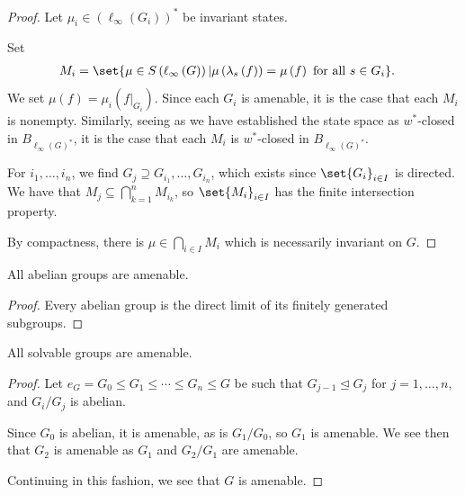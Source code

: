 \begin{proof}
  Let $\mu_i\in \left(\ell_{\infty}\left(G_i\right)\right)^{\ast}$ be invariant states.\newline

  Set
  \begin{align*}
    M_i &= \set{\mu\in S\left(\ell_{\infty}\left(G\right)\right)| \mu\left(\lambda_s\left(f\right)\right) = \mu\left(f\right)\text{ for all }s\in G_i}.
  \end{align*}
  We set $\mu\left(f\right) = \mu_i\left(f|_{G_i}\right)$. Since each $G_i$ is amenable, it is the case that each $M_i$ is nonempty. Similarly, seeing as we have established the state space as $w^{\ast}$-closed in $B_{\ell_{\infty}\left(G\right)^{\ast}}$, it is the case that each $M_i$ is $w^{\ast}$-closed in $B_{\ell_{\infty}\left(G\right)^{\ast}}$.\newline

  For $i_1,\dots,i_n$, we find $G_j \supseteq G_{i_1},\dots,G_{i_n}$, which exists since $\set{G_i}_{i\in I}$ is directed. We have that $M_j\subseteq \bigcap_{k=1}^{n}M_{i_k}$, so $\set{M_i}_{i\in I}$ has the finite intersection property.\newline

  By compactness, there is $\mu\in \bigcap_{i\in I}M_i$ which is necessarily invariant on $G$.
\end{proof}
\begin{corollary}
  All abelian groups are amenable.
\end{corollary}
\begin{proof}
  Every abelian group is the direct limit of its finitely generated subgroups.
\end{proof}
\begin{corollary}\label{cor:solvable_groups_amenable}
  All solvable groups are amenable.
\end{corollary}
\begin{proof}
  Let $e_G = G_0 \leq G_1\leq\cdots\leq G_n\leq G$ be such that $G_{j-1}\trianglelefteq G_j$ for $j=1,\dots,n$, and $G_i/G_j$ is abelian.\newline

  Since $G_0$ is abelian, it is amenable, as is $G_1/G_0$, so $G_1$ is amenable. We see then that $G_2$ is amenable as $G_1$ and $G_2/G_1$ are amenable.\newline

  Continuing in this fashion, we see that $G$ is amenable.
\end{proof}
